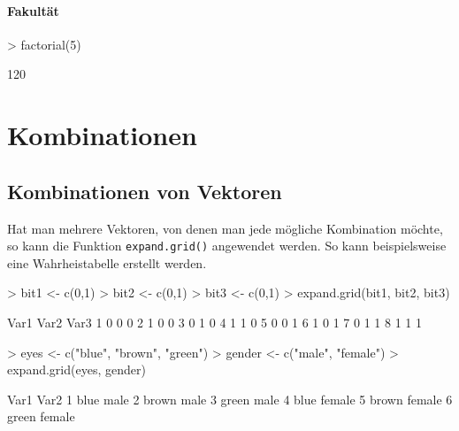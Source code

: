\paragraph{Fakultät}
\begin{Schunk}
\begin{Sinput}
> factorial(5)
\end{Sinput}
\begin{Soutput}
[1] 120
\end{Soutput}
\end{Schunk}

\section{Kombinationen}

\subsection{Kombinationen von Vektoren}
Hat man mehrere Vektoren, von denen man jede mögliche
Kombination möchte, so kann die Funktion 
\lstinline{expand.grid()} angewendet werden.
So kann beispielsweise eine Wahrheistabelle erstellt werden.
\begin{Schunk}
\begin{Sinput}
> bit1 <- c(0,1)
> bit2 <- c(0,1)
> bit3 <- c(0,1)
> expand.grid(bit1, bit2, bit3)
\end{Sinput}
\begin{Soutput}
  Var1 Var2 Var3
1    0    0    0
2    1    0    0
3    0    1    0
4    1    1    0
5    0    0    1
6    1    0    1
7    0    1    1
8    1    1    1
\end{Soutput}
\end{Schunk}

\begin{Schunk}
\begin{Sinput}
> eyes <- c("blue", "brown", "green")
> gender <- c("male", "female")
> expand.grid(eyes, gender)
\end{Sinput}
\begin{Soutput}
   Var1   Var2
1  blue   male
2 brown   male
3 green   male
4  blue female
5 brown female
6 green female
\end{Soutput}
\end{Schunk}

